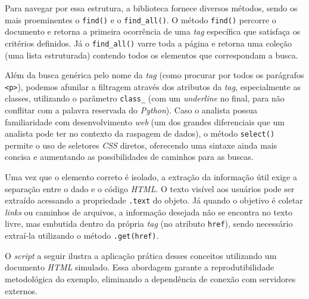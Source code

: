 \documentclass[
  brazilian,
  letterpaper,
  DIV=11,
  numbers=noendperiod]{scrreprt}
\begin{document}
Para navegar por essa estrutura, a biblioteca fornece diversos métodos,
sendo os mais proeminentes o \texttt{find()} e o \texttt{find\_all()}. O
método \texttt{find()} percorre o documento e retorna a primeira
ocorrência de uma \emph{tag} específica que satisfaça os critérios
definidos. Já o \texttt{find\_all()} varre toda a página e retorna uma
coleção (uma lista estruturada) contendo todos os elementos que
correspondam a busca.

Além da busca genérica pelo nome da \emph{tag} (como procurar por todos
os parágrafos \texttt{\textless{}p\textgreater{}}), podemos afunilar a
filtragem através dos atributos da \emph{tag}, especialmente as classes,
utilizando o parâmetro \texttt{class\_} (com um \emph{underline} no
final, para não conflitar com a palavra reservada do \emph{Python}).
Caso o analista possua familiaridade com desenvolvimento \emph{web} (um
dos grandes diferenciais que um analista pode ter no contexto da
raspagem de dados), o método \texttt{select()} permite o uso de
seletores \emph{CSS} diretos, oferecendo uma sintaxe ainda mais concisa
e aumentando as possibilidades de caminhos para as buscas.

Uma vez que o elemento correto é isolado, a extração da informação útil
exige a separação entre o dado e o código \emph{HTML}. O texto visível
aos usuários pode ser extraído acessando a propriedade \texttt{.text} do
objeto. Já quando o objetivo é coletar \emph{links} ou caminhos de
arquivos, a informação desejada não se encontra no texto livre, mas
embutida dentro da própria \emph{tag} (no atributo \texttt{href}), sendo
necessário extraí-la utilizando o método
\texttt{.get(\textquotesingle{}href\textquotesingle{})}.

O \emph{script} a seguir ilustra a aplicação prática desses conceitos
utilizando um documento \emph{HTML} simulado. Essa abordagem garante a
reprodutibilidade metodológica do exemplo, eliminando a dependência de
conexão com servidores externos.
\end{document}
